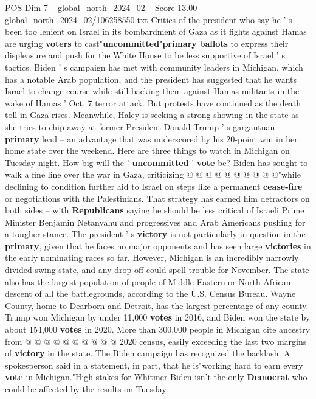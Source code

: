 \begin{textsample}{POS Dim 7 – global\_north\_2024\_02 – Score 13.00 – global\_north\_2024\_02/106258550.txt}  \label{ex:f7_pos_029}
Critics of the president who say he ' s been too lenient on Israel in its bombardment of Gaza as it fights against Hamas are urging \textbf{voters} to cast"\textbf{uncommitted}"\textbf{primary} \textbf{ballots} to express their displeasure and push for the White House to be less supportive of Israel ' s tactics.
Biden ' s campaign has met with community leaders in Michigan, which has a notable Arab population, and the president has suggested that he wants Israel to change course while still backing them against Hamas militants in the wake of Hamas ' Oct. 7 terror attack.
But protests have continued as the death toll in Gaza rises.
Meanwhile, Haley is seeking a strong showing in the state as she tries to chip away at former President Donald Trump ' s gargantuan \textbf{primary} lead -- an advantage that was underscored by his 20-point win in her home state over the weekend.
Here are three things to watch in Michigan on Tuesday night.
How big will the ' \textbf{uncommitted} ' \textbf{vote} be?
Biden has sought to walk a fine line over the war in Gaza, criticizing @ @ @ @ @ @ @ @ @ @"while declining to condition further aid to Israel on steps like a permanent \textbf{cease-fire} or negotiations with the Palestinians.
That strategy has earned him detractors on both sides -- with \textbf{Republicans} saying he should be less critical of Israeli Prime Minister Benjamin Netanyahu and progressives and Arab Americans pushing for a tougher stance.
The president ' s \textbf{victory} is not particularly in question in the \textbf{primary}, given that he faces no major opponents and has seen large \textbf{victories} in the early nominating races so far.
However, Michigan is an incredibly narrowly divided swing state, and any drop off could spell trouble for November.
The state also has the largest population of people of Middle Eastern or North African descent of all the battlegrounds, according to the U.S.
Census Bureau.
Wayne County, home to Dearborn and Detroit, has the largest percentage of any county.
Trump won Michigan by under 11,000 \textbf{votes} in 2016, and Biden won the state by about 154,000 \textbf{votes} in 2020.
More than 300,000 people in Michigan cite ancestry from @ @ @ @ @ @ @ @ @ @ 2020 census, easily exceeding the last two margins of \textbf{victory} in the state.
The Biden campaign has recognized the backlash.
A spokesperson said in a statement, in part, that he is"working hard to earn every \textbf{vote} in Michigan."High stakes for Whitmer Biden isn't the only \textbf{Democrat} who could be affected by the results on Tuesday.

\end{textsample}
